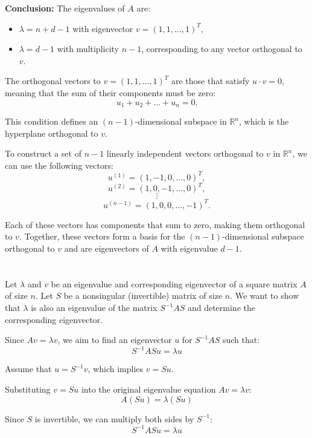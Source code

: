 \documentclass{article}
\begin{document}
\textbf{Conclusion:} The eigenvalues of \( A \) are:
\begin{itemize}
    \item \( \lambda = n + d - 1 \) with eigenvector \( v = (1, 1, \dots, 1)^T \),
    \item \( \lambda = d - 1 \) with multiplicity \( n - 1 \), corresponding to any vector orthogonal to \( v \).
\end{itemize}

The orthogonal vectors to \( v = (1, 1, \dots, 1)^T \) are those that satisfy \( u \cdot v = 0 \), meaning that the sum of their components must be zero:
\[
    u_1 + u_2 + \dots + u_n = 0.
\]

This condition defines an \( (n-1) \)-dimensional subspace in \( \mathbb{R}^n \), which is the hyperplane orthogonal to \( v \).

To construct a set of \( n-1 \) linearly independent vectors orthogonal to \( v \) in \( \mathbb{R}^n \), we can use the following vectors:
\[
    u^{(1)} = (1, -1, 0, \dots, 0)^T,
\]
\[
    u^{(2)} = (1, 0, -1, \dots, 0)^T,
\]
\[
    \vdots
\]
\[
    u^{(n-1)} = (1, 0, 0, \dots, -1)^T.
\]

Each of these vectors has components that sum to zero, making them orthogonal to \( v \). Together, these vectors form a basis for the \( (n-1) \)-dimensional subspace orthogonal to \( v \) and are eigenvectors of \( A \) with eigenvalue \( d - 1 \).

\section{}

Let \(\lambda\) and \(v\) be an eigenvalue and corresponding eigenvector of a square matrix \(A\) of size \(n\). Let \(S\) be a nonsingular (invertible) matrix of size \(n\). We want to show that \(\lambda\) is also an eigenvalue of the matrix \(S^{-1} A S\) and determine the corresponding eigenvector.

Since \(A v = \lambda v\), we aim to find an eigenvector \(u\) for \(S^{-1} A S\) such that:
\[
    S^{-1} A S u = \lambda u
\]

Assume that \(u = S^{-1} v\), which implies \(v = S u\).

Substituting \(v = S u\) into the original eigenvalue equation \(A v = \lambda v\):
\[
    A (S u) = \lambda (S u)
\]

Since \(S\) is invertible, we can multiply both sides by \(S^{-1}\):
\[
    S^{-1} A S u = \lambda u
\]
\end{document}

